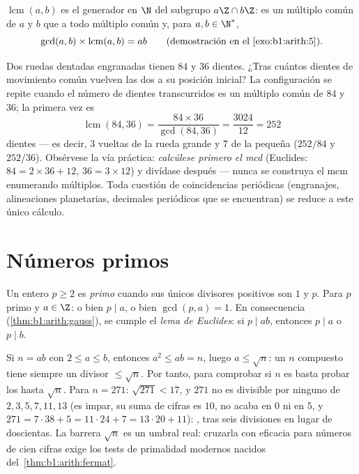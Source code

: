 \begin{definition}\label{def:b1:arith:lcm}
$\operatorname{lcm}(a, b)$ es el generador
en $\N$ del subgrupo $a\Z \cap b\Z$: es un múltiplo común de $a$ y $b$
que  a todo múltiplo común y, para $a, b \in \N^*$,
\[
\gcd(a,b) \times \operatorname{lcm}(a,b) = ab
\qquad (\text{demostración en el } \cref{exo:b1:arith:5}).
\]
\end{definition}

\begin{example}\label{ex:b1:arith:gears}
Dos ruedas dentadas engranadas tienen $84$ y $36$ dientes. ¿Tras
cuántos dientes de movimiento común vuelven las dos a su posición
inicial? La configuración se repite cuando el número de dientes
transcurridos es un múltiplo común de $84$ y $36$; la primera vez es
\[
\operatorname{lcm}(84, 36) = \frac{84 \times 36}{\gcd(84, 36)}
= \frac{3024}{12} = 252
\]
dientes --- es decir, $3$ vueltas de la rueda grande y $7$ de la
pequeña ($252/84$ y $252/36$). Obsérvese la vía práctica:
\emph{calcúlese primero el mcd} (Euclides: $84 = 2\times36 + 12$,
$36 = 3\times12$) y divídase después --- nunca se construya el mcm
enumerando múltiplos. Toda cuestión de coincidencias periódicas
(engranajes, alineaciones planetarias, decimales periódicos que se
encuentran) se reduce a este único cálculo.
\end{example}

\section{Números primos}

\begin{definition}\label{def:b1:arith:prime}
Un entero $p \geq 2$ es \emph{primo} cuando sus
únicos divisores positivos son $1$ y $p$. Para $p$ primo y $a \in \Z$:
o bien $p \mid a$, o bien $\gcd(p, a) = 1$. En consecuencia
(\cref{thm:b1:arith:gauss}), se cumple el \emph{lema de Euclides}: si
$p \mid ab$, entonces $p \mid a$ o $p \mid b$.
\end{definition}

\begin{remark}\label{rem:b1:arith:trialdivision}
Si $n = ab$ con $2 \leq a \leq b$, entonces $a^2 \leq ab = n$, luego
$a \leq \sqrt n$: un $n$ compuesto tiene siempre un divisor 
$\leq \sqrt n$. Por tanto, para comprobar si $n$ es  basta
probar los  hasta $\sqrt n$. Para $n = 271$: $\sqrt{271} < 17$,
y $271$ no es divisible por ninguno de $2, 3, 5, 7, 11, 13$ (es impar,
su suma de cifras es $10$, no acaba en $0$ ni en $5$, y
$271 = 7\cdot38 + 5 = 11\cdot24 + 7 = 13\cdot20 + 11$): , tras
seis divisiones en lugar de doscientas. La barrera $\sqrt n$ es un
umbral real: cruzarla con eficacia para números de cien cifras exige
los tests de primalidad modernos nacidos
del~\cref{thm:b1:arith:fermat}.
\end{remark}

